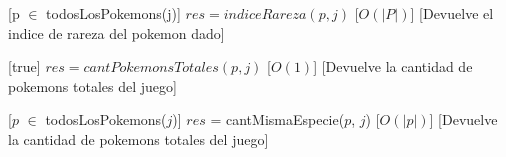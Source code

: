 \begin{Interfaz}
%
[p $\in$ todosLosPokemons(j)] 
{$res = indiceRareza(p, j)$}  %
[$O(|P|)$] %
[Devuelve el indice de rareza del pokemon dado]


%
[true] 
{$res = cantPokemonsTotales(p, j)$}  %
[$O(1)$] %
[Devuelve la cantidad de pokemons totales del juego]



[$p$ $\in$ todosLosPokemons($j$)] 
{$res$ = cantMismaEspecie($p$, $j$)}  %
[$O(|p|)$] %
[Devuelve la cantidad de pokemons totales del juego]


\end{Interfaz}

~ 


